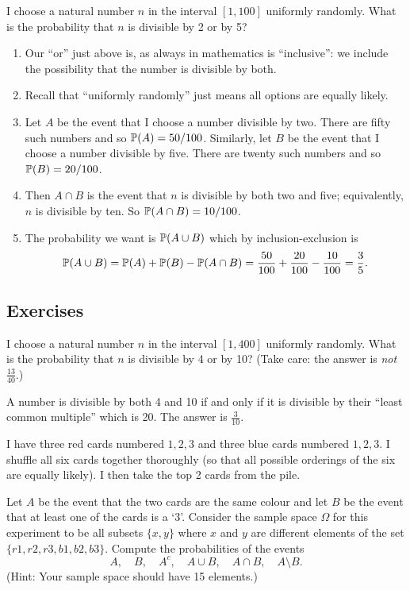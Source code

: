 \begin{example}
I choose a natural number $n$ in the interval $[1,100]$ uniformly randomly. What is the probability that $n$ is divisible by 2 or by 5?
\begin{enumerate}
    \item Our ``or'' just above is, as always in mathematics is ``inclusive'': we include the possibility that the number is divisible by both. 
    \item Recall that ``uniformly randomly'' just means all options are equally likely.
    \item Let $A$ be the event that I choose a number divisible by two. There are fifty such numbers and so ${\mathbb P}(A) = 50/100$. Similarly, let $B$ be the event that I choose a number divisible by five. There are twenty such numbers and so ${\mathbb P}(B) = 20/100$. 
    \item Then $A \cap B$ is the event that $n$ is divisible by both two and five; equivalently, $n$ is divisible by ten. So ${\mathbb P}(A \cap B) = 10/100$. 
    \item The probability we want is ${\mathbb P}(A \cup B)$ which by inclusion-exclusion is 
    \[
     {\mathbb P}(A \cup B) = {\mathbb P}(A) + {\mathbb P}(B) - {\mathbb P}(A \cap B) = 
      \frac{50}{100} + \frac{20}{100} - \frac{10}{100} = \frac35. 
    \]
\end{enumerate}
\end{example}

\subsection{Exercises}
\begin{exer}
I choose a natural number $n$ in the interval $[1,400]$ uniformly randomly. What is the probability that $n$ is divisible by 4 or by 10?  (Take care: the answer is \emph{not} $\frac{13}{40}$.) 
\end{exer} 

\begin{sol}
A number is divisible by both 4 and 10 if and only if it is divisible by their ``least common multiple'' which is 20.  The answer is $\frac{3}{10}$. 
\end{sol}

\begin{exer} 
I have three red cards numbered $1,2,3$ and three blue cards numbered $1,2,3$.  I shuffle all six cards together thoroughly (so that all possible orderings of the six are equally likely). I then take the top 2 cards from the pile. 

Let $A$ be the event that the two cards are the same colour and let $B$ be the event that at least one of the cards is a `3'. Consider the sample space $\Omega$ for this experiment to be all subsets $\{ x,y \}$ where $x$ and $y$ are different elements of the set $\{ r1, r2, r3, b1, b2, b3\}$. Compute the probabilities of the events
 \[
   A,\quad B,\quad A^c,\quad A \cup B,\quad A \cap B,\quad A \setminus B. 
 \]
(Hint: Your sample space should have 15 elements.) 
\end{exer}
